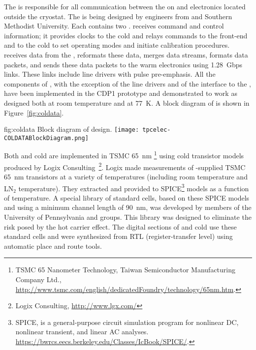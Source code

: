 The   is responsible for all communication between the %
 on  and electronics located outside the cryostat.  The   is being designed by engineers from \fnal and Southern Methodist University.  Each  contains two  .   receives command and control information; it provides clocks to the cold   and relays commands to the  front-end and to the cold   to set operating modes and initiate calibration procedures.   receives data from the  , reformats these data, merges data streams, formats data packets, and sends these data packets to the warm electronics using \SI{1.28}{Gbps} links.  These links include line drivers with pulse pre-emphasis.  All the components of , with the exception of the line drivers and of the interface to the , have been implemented in the CDP1 prototype  and demonstrated to work as designed both at room temperature and at \SI{77}{K}.  A block diagram of  is shown in Figure~\ref{fig:coldata}.  

\begin{dunefigure}
{fig:coldata}
{Block diagram of   design.}
\texttt{[image: tpcelec-COLDATABlockDiagram.png]}
\end{dunefigure}

Both  and cold  are implemented in TSMC \SI{65}{nm} \footnote{TSMC 65 Nanometer Technology\texttrademark{}, Taiwan Semiconductor Manufacturing Company Ltd., \url{http://www.tsmc.com/english/dedicatedFoundry/technology/65nm.htm}.} 
using cold transistor models produced by Logix Consulting~\footnote{Logix Consulting\texttrademark{}, \url{http://www.lgx.com/}}.  Logix made measurements of \fnal-supplied TSMC \SI{65}{nm} transistors at a variety of temperatures (including room temperature and LN$_2$ temperature).  They extracted and provided to \fnal SPICE\footnote{SPICE\texttrademark{}, is a general-purpose circuit simulation program for nonlinear DC, nonlinear transient, and linear AC analyses. \url{https://bwrcs.eecs.berkeley.edu/Classes/IcBook/SPICE/}.} models as a function of temperature.  A special library of standard cells, based on these SPICE models and using a minimum channel length of \SI{90}{nm}, was developed by members of the University of Pennsylvania and \fnal groups.  This library was designed to eliminate the risk posed by the hot carrier effect.  The digital sections of  and cold  use these standard cells and were synthesized from RTL (register-transfer level) using automatic place and route tools.
